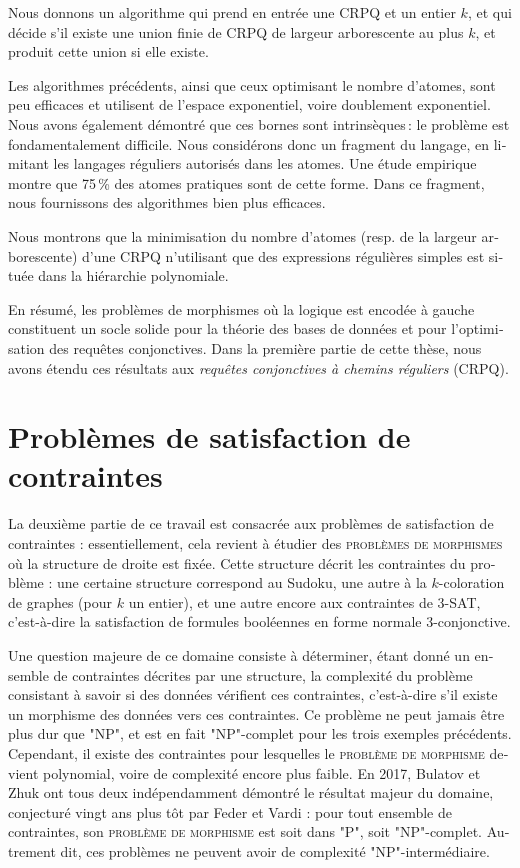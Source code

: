 \begin{french}
\begin{contribution}
	Nous donnons un algorithme qui prend en entrée une CRPQ et un entier $k$, et qui décide s'il existe une union finie de CRPQ de largeur arborescente au plus $k$, et produit cette union si elle existe.
\end{contribution}

Les algorithmes précédents, ainsi que ceux optimisant le nombre d'atomes,
sont peu efficaces et utilisent de l'espace exponentiel, voire doublement exponentiel. 
Nous avons également démontré que ces bornes sont intrinsèques : le problème est fondamentalement difficile.
Nous considérons donc un fragment du langage, en limitant les langages réguliers autorisés dans les atomes. Une étude empirique montre que 75 \% des atomes pratiques sont de cette forme.
Dans ce fragment, nous fournissons des algorithmes bien plus efficaces.

\begin{contribution}
	Nous montrons que la minimisation du nombre d'atomes (resp. de la largeur arborescente) d'une CRPQ n'utilisant que des expressions régulières simples est située dans la hiérarchie polynomiale.
\end{contribution}

En résumé, les problèmes de morphismes où la logique est encodée à gauche constituent un socle solide pour la théorie des bases de données et pour l'optimisation des requêtes conjonctives. Dans la première partie de cette thèse, nous avons étendu ces résultats aux \emph{requêtes conjonctives à chemins réguliers} (CRPQ).

\section*{Problèmes de satisfaction de contraintes}

La deuxième partie de ce travail est consacrée aux problèmes de satisfaction de contraintes :
essentiellement, cela revient à étudier des \textsc{problèmes de morphismes} où
la structure de droite est fixée. Cette structure décrit les contraintes du problème :
une certaine structure correspond au Sudoku, une autre à la $k$-coloration de graphes
(pour $k$ un entier), et une autre encore aux contraintes de 3-SAT, c'est-à-dire la satisfaction
de formules booléennes en forme normale 3-conjonctive.

Une question majeure de ce domaine consiste à déterminer,
étant donné un ensemble de contraintes décrites par une structure, la complexité du problème
consistant à savoir si des données vérifient ces contraintes, 
c'est-à-dire s'il existe un morphisme des données vers ces contraintes.
Ce problème ne peut jamais être plus dur que "NP", et est en fait "NP"-complet
pour les trois exemples précédents. Cependant, il existe des contraintes
pour lesquelles le \textsc{problème de morphisme} devient polynomial, voire de complexité encore plus faible.
En 2017, Bulatov et Zhuk ont tous deux indépendamment démontré
le résultat majeur du domaine, conjecturé vingt ans plus tôt par Feder et Vardi :
pour tout ensemble de contraintes, son \textsc{problème de morphisme} est
soit dans "P", soit "NP"-complet. Autrement dit, ces problèmes ne peuvent
avoir de complexité "NP"-intermédiaire.


\end{french}
